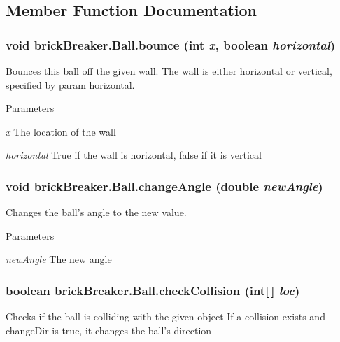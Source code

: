 \subsection{Member Function Documentation}
\hypertarget{classbrick_breaker_1_1_ball_a102b54397819a72161278ccfeb1f5d72}{
\subsubsection[{bounce}]{\setlength{\rightskip}{0pt plus 5cm}void brickBreaker.Ball.bounce (int {\em x}, \/  boolean {\em horizontal})}}
\label{classbrick_breaker_1_1_ball_a102b54397819a72161278ccfeb1f5d72}
Bounces this ball off the given wall. The wall is either horizontal or vertical, specified by param horizontal. 
\begin{DoxyParams}{Parameters}
\item[{\em x}]The location of the wall \item[{\em horizontal}]True if the wall is horizontal, false if it is vertical \end{DoxyParams}
\hypertarget{classbrick_breaker_1_1_ball_a443ce0341305785eaf4da97d755bb550}{
\subsubsection[{changeAngle}]{\setlength{\rightskip}{0pt plus 5cm}void brickBreaker.Ball.changeAngle (double {\em newAngle})}}
\label{classbrick_breaker_1_1_ball_a443ce0341305785eaf4da97d755bb550}
Changes the ball's angle to the new value. 
\begin{DoxyParams}{Parameters}
\item[{\em newAngle}]The new angle \end{DoxyParams}
\hypertarget{classbrick_breaker_1_1_ball_aff35873f2550b5b0601cfb7b31cfc368}{
\subsubsection[{checkCollision}]{\setlength{\rightskip}{0pt plus 5cm}boolean brickBreaker.Ball.checkCollision (int\mbox{[}$\,$\mbox{]} {\em loc})}}
\label{classbrick_breaker_1_1_ball_aff35873f2550b5b0601cfb7b31cfc368}
Checks if the ball is colliding with the given object If a collision exists and changeDir is true, it changes the ball's direction


